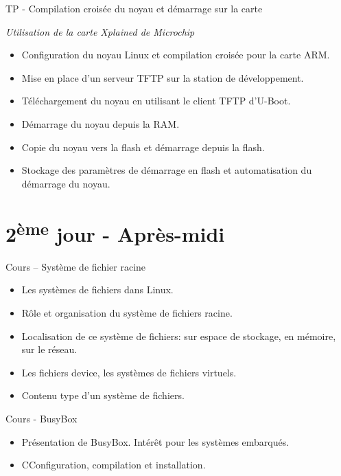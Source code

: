 \documentclass[a4paper,12pt,obeyspaces,spaces,hyphens]{article}
\begin{document}
\feagendaonecolumn
{TP - Compilation croisée du noyau et démarrage sur la carte}
{
  {\em Utilisation de la carte Xplained de Microchip}
  \begin{itemize}
  \item Configuration du noyau Linux et compilation croisée pour la carte ARM.
  \item Mise en place d'un serveur TFTP sur la station de développement.
  \item Téléchargement du noyau en utilisant le client TFTP d'U-Boot.
  \item Démarrage du noyau depuis la RAM.
  \item Copie du noyau vers la flash et démarrage depuis la flash.
  \item Stockage des paramètres de démarrage en flash et automatisation
	du démarrage du noyau.
  \end{itemize}
}

\section{2\textsuperscript{ème} jour - Après-midi}

\feagendatwocolumn
{Cours – Système de fichier racine}
{
  \begin{itemize}
  \item Les systèmes de fichiers dans Linux.
  \item Rôle et organisation du système de fichiers racine.
  \item Localisation de ce système de fichiers: sur espace
	de stockage, en mémoire, sur le réseau.
  \item Les fichiers device, les systèmes de fichiers virtuels.
  \item Contenu type d'un système de fichiers.
  \end{itemize}
}
{Cours - BusyBox}
{
  \begin{itemize}
  \item Présentation de BusyBox. Intérêt pour les systèmes embarqués.
  \item CConfiguration, compilation et installation.
  \end{itemize}
}
\end{document}
